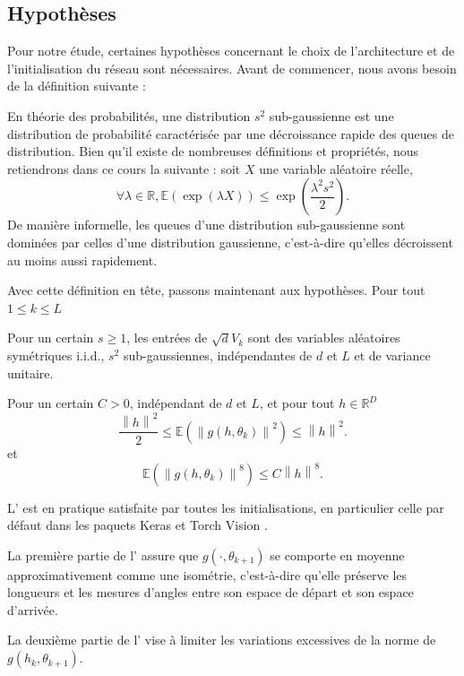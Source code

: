 \subsection*{Hypothèses}
Pour notre étude, certaines hypothèses concernant le choix de l'architecture et de l'initialisation du réseau sont nécessaires. Avant de commencer, nous avons besoin de la définition suivante :
\begin{definition}
    En théorie des probabilités, une distribution $s^2$ sub-gaussienne est une distribution de probabilité caractérisée par une décroissance rapide des queues de distribution. Bien qu'il existe de nombreuses définitions et propriétés, nous retiendrons dans ce cours la suivante : soit $X$ une variable aléatoire réelle,
    \[
        \forall \lambda \in \mathbb{R}, \mathbb{E}(\exp(\lambda X)) \leqslant \exp\left(\frac{\lambda^2 s^2}{2}\right).
    \]
    De manière informelle, les queues d'une distribution sub-gaussienne sont dominées par celles d'une distribution gaussienne, c'est-à-dire qu'elles décroissent au moins aussi rapidement.
\end{definition}
Avec cette définition en tête, passons maintenant aux hypothèses. Pour tout $ 1 \leqslant  k \leqslant L  $
\begin{assumption}\label{H1}
    Pour un certain $ s \geqslant 1 $, les entrées de  $ \sqrt{d}V_k $ sont des variables aléatoires symétriques i.i.d., $ s^2 $ sub-gaussiennes, indépendantes de $ d $ et $ L $ et de variance unitaire.
\end{assumption}
    
\begin{assumption}\label{H2}
    Pour un certain $ C > 0 $, indépendant de $ d $ et $ L $, et pour tout $ h \in \mathbb{R}^D  $ 
    \[
        \frac{\left\| h \right\| ^2}{2 } \leqslant  \mathbb{E}\left( \left\|  g(h, \theta _ k ) \right\| ^2 \right) \leqslant \left\| h \right\| ^2
    .\]
    et
    \[
        \mathbb{E } \left(\left\| g(h, \theta _k)  \right\| ^8 \right) \leqslant C \left\| h  \right\| ^8
    .\]
\end{assumption}

\begin{note}
    L' est en pratique satisfaite par toutes les initialisations, en particulier celle par défaut dans les paquets Keras \citep{chollet2015keras} et Torch Vision \citep{torchvision2016}.

    La première partie de l' assure que $g(\cdot, \theta_{k+1})$ se comporte en moyenne approximativement comme une isométrie, c'est-à-dire qu'elle préserve les longueurs et les mesures d'angles entre son espace de départ et son espace d'arrivée.

    La deuxième partie de l' vise à limiter les variations excessives de la norme de $g(h_k, \theta_{k+1})$.
\end{note}

